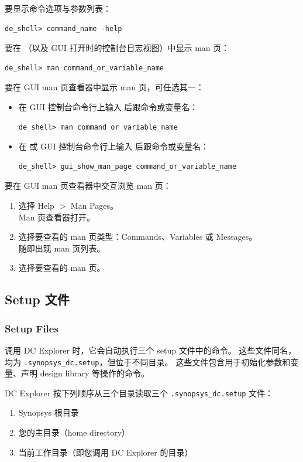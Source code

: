 要显示命令选项与参数列表：
\begin{lstlisting}
de_shell> command_name -help
\end{lstlisting}

要在 （以及 GUI 打开时的控制台日志视图）中显示 man 页：
\begin{lstlisting}
de_shell> man command_or_variable_name
\end{lstlisting}

要在 GUI man 页查看器中显示 man 页，可任选其一：
\begin{itemize}
  \item 在 GUI 控制台命令行上输入  后跟命令或变量名：
\begin{lstlisting}
de_shell> man command_or_variable_name
\end{lstlisting}
  \item 在  或 GUI 控制台命令行上输入  后跟命令或变量名：
\begin{lstlisting}
de_shell> gui_show_man_page command_or_variable_name
\end{lstlisting}
\end{itemize}

要在 GUI man 页查看器中交互浏览 man 页：
\begin{enumerate}
  \item 选择 Help $>$ Man Pages。\\
        Man 页查看器打开。
  \item 选择要查看的 man 页类型：Commands、Variables 或 Messages。\\
        随即出现 man 页列表。
  \item 选择要查看的 man 页。
\end{enumerate}

\subsection{Setup 文件}
\subsubsection*{Setup Files}

调用 DC Explorer 时，它会自动执行三个 setup 文件中的命令。
这些文件同名，均为 \texttt{.synopsys\_dc.setup}，但位于不同目录。
这些文件包含用于初始化参数和变量、声明 design library 等操作的命令。

DC Explorer 按下列顺序从三个目录读取三个 \texttt{.synopsys\_dc.setup} 文件：
\begin{enumerate}
  \item Synopsys 根目录
  \item 您的主目录（home directory）
  \item 当前工作目录（即您调用 DC Explorer 的目录）
\end{enumerate}

